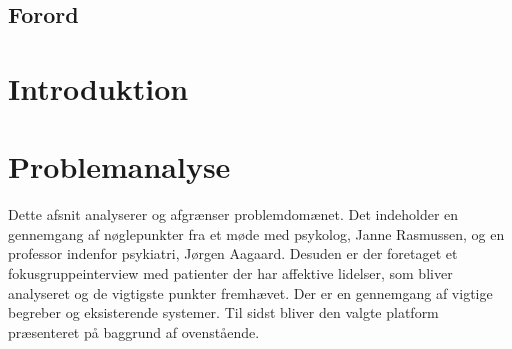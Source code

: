 %
%
%
%
% 



\pagestyle{empty} %
%
%

\cleardoublepage

\section*{Forord}

\cleardoublepage

\pagestyle{fancy} %
\setcounter{tocdepth}{1}
\tableofcontents
\listoftodos
%
\cleardoublepage

\chapter*{Introduktion}


\chapter{Problemanalyse}
Dette afsnit analyserer og afgrænser problemdomænet.
Det indeholder en gennemgang af nøglepunkter fra et møde med psykolog, Janne Rasmussen, og en professor indenfor psykiatri, Jørgen Aagaard.
Desuden er der foretaget et fokusgruppeinterview med patienter der har affektive lidelser, som bliver analyseret og de vigtigste punkter fremhævet.
Der er en gennemgang af vigtige begreber og eksisterende systemer.
Til sidst bliver den valgte platform præsenteret på baggrund af ovenstående.


